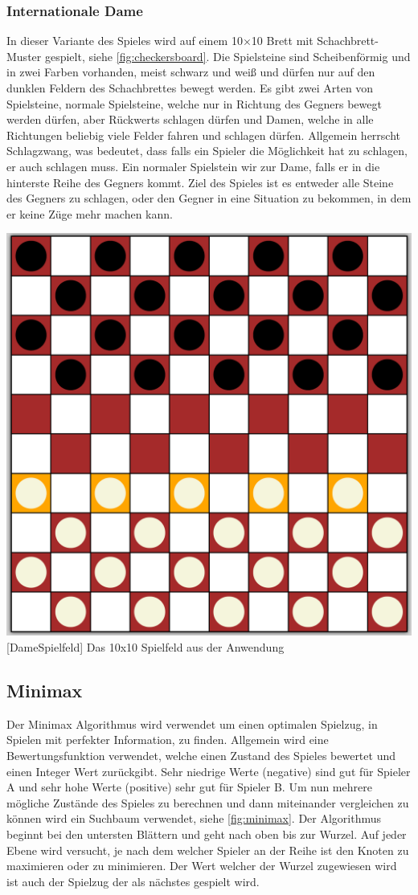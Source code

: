\documentclass[12pt,a4paper,bibliography=totocnumbered,listof=totocnumbered]{article}
\begin{document}
\subsubsection{Internationale Dame}
In dieser Variante des Spieles wird auf einem 10×10 Brett mit Schachbrett-Muster gespielt, 
siehe \ref{fig:checkersboard}. Die Spielsteine
sind Scheibenförmig und in zwei Farben vorhanden, meist schwarz und weiß und dürfen nur auf den dunklen
Feldern des Schachbrettes bewegt werden. Es gibt zwei Arten von Spielsteine, normale Spielsteine, welche
nur in Richtung des Gegners bewegt werden dürfen, aber Rückwerts schlagen dürfen und Damen, welche
in alle Richtungen beliebig viele Felder fahren und schlagen dürfen. Allgemein herrscht Schlagzwang,
was bedeutet, dass falls ein Spieler die Möglichkeit hat zu schlagen, er auch schlagen muss.
Ein normaler Spielstein wir zur Dame, falls er in die hinterste Reihe des Gegners kommt.
Ziel des Spieles ist es entweder alle Steine des Gegners zu schlagen, oder den Gegner in eine Situation
zu bekommen, in dem er keine Züge mehr machen kann. 

\vspace{1em}
\begin{minipage}{\linewidth}
	\centering
	\includegraphics[width=0.5\linewidth]{pics/checkersboard.png}
	[DameSpielfeld]{ Das 10x10 Spielfeld aus der Anwendung }
	\label{fig:checkersboard}
\end{minipage}

\subsection{Minimax}
Der Minimax Algorithmus wird verwendet um einen optimalen Spielzug, in Spielen mit perfekter Information,
zu finden. Allgemein wird eine Bewertungsfunktion verwendet, welche einen Zustand des Spieles bewertet und 
einen Integer Wert zurückgibt. Sehr niedrige Werte (negative) sind gut für Spieler A und sehr hohe Werte 
(positive) sehr gut für Spieler B. Um nun mehrere mögliche Zustände des Spieles zu berechnen und dann miteinander 
vergleichen zu können wird ein Suchbaum verwendet, siehe \ref{fig:minimax}. Der Algorithmus beginnt bei den untersten Blättern und geht
nach oben bis zur Wurzel. Auf jeder Ebene wird versucht, je nach dem welcher Spieler an der Reihe ist den Knoten zu
maximieren oder zu minimieren. Der Wert welcher der Wurzel zugewiesen wird ist auch der Spielzug der als nächstes
gespielt wird. 
\end{document}
